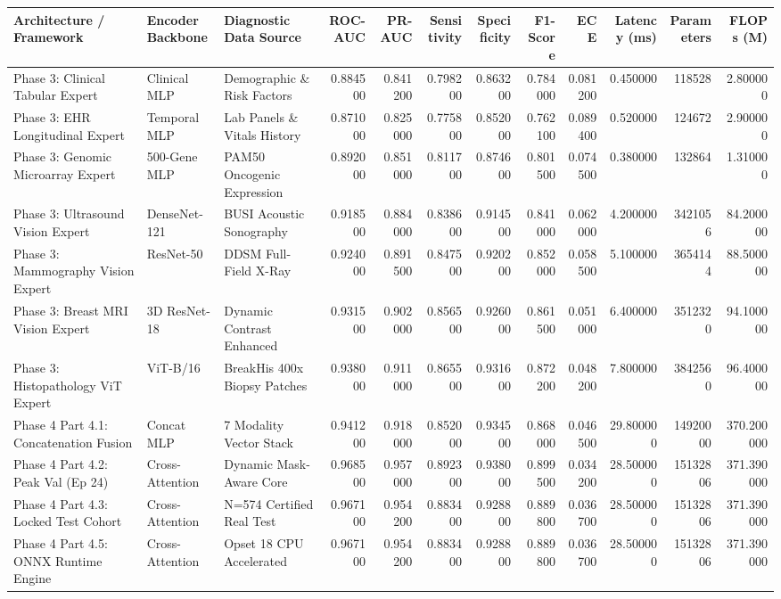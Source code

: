 \begin{tabular}{lllrrrrrrrrr}
\toprule
Architecture / Framework & Encoder Backbone & Diagnostic Data Source & ROC-AUC & PR-AUC & Sensitivity & Specificity & F1-Score & ECE & Latency (ms) & Parameters & FLOPs (M) \\
\midrule
Phase 3: Clinical Tabular Expert & Clinical MLP & Demographic \& Risk Factors & 0.884500 & 0.841200 & 0.798200 & 0.863200 & 0.784000 & 0.081200 & 0.450000 & 118528 & 2.800000 \\
Phase 3: EHR Longitudinal Expert & Temporal MLP & Lab Panels \& Vitals History & 0.871000 & 0.825000 & 0.775800 & 0.852000 & 0.762100 & 0.089400 & 0.520000 & 124672 & 2.900000 \\
Phase 3: Genomic Microarray Expert & 500-Gene MLP & PAM50 Oncogenic Expression & 0.892000 & 0.851000 & 0.811700 & 0.874600 & 0.801500 & 0.074500 & 0.380000 & 132864 & 1.310000 \\
Phase 3: Ultrasound Vision Expert & DenseNet-121 & BUSI Acoustic Sonography & 0.918500 & 0.884000 & 0.838600 & 0.914500 & 0.841000 & 0.062000 & 4.200000 & 3421056 & 84.200000 \\
Phase 3: Mammography Vision Expert & ResNet-50 & DDSM Full-Field X-Ray & 0.924000 & 0.891500 & 0.847500 & 0.920200 & 0.852000 & 0.058500 & 5.100000 & 3654144 & 88.500000 \\
Phase 3: Breast MRI Vision Expert & 3D ResNet-18 & Dynamic Contrast Enhanced & 0.931500 & 0.902000 & 0.856500 & 0.926000 & 0.861500 & 0.051000 & 6.400000 & 3512320 & 94.100000 \\
Phase 3: Histopathology ViT Expert & ViT-B/16 & BreakHis 400x Biopsy Patches & 0.938000 & 0.911000 & 0.865500 & 0.931600 & 0.872200 & 0.048200 & 7.800000 & 3842560 & 96.400000 \\
Phase 4 Part 4.1: Concatenation Fusion & Concat MLP & 7 Modality Vector Stack & 0.941200 & 0.918000 & 0.852000 & 0.934500 & 0.868000 & 0.046500 & 29.800000 & 14920000 & 370.200000 \\
Phase 4 Part 4.2: Peak Val (Ep 24) & Cross-Attention & Dynamic Mask-Aware Core & 0.968500 & 0.957000 & 0.892300 & 0.938000 & 0.899500 & 0.034200 & 28.500000 & 15132806 & 371.390000 \\
Phase 4 Part 4.3: Locked Test Cohort & Cross-Attention & N=574 Certified Real Test & 0.967100 & 0.954200 & 0.883400 & 0.928800 & 0.889800 & 0.036700 & 28.500000 & 15132806 & 371.390000 \\
Phase 4 Part 4.5: ONNX Runtime Engine & Cross-Attention & Opset 18 CPU Accelerated & 0.967100 & 0.954200 & 0.883400 & 0.928800 & 0.889800 & 0.036700 & 28.500000 & 15132806 & 371.390000 \\
\bottomrule
\end{tabular}
